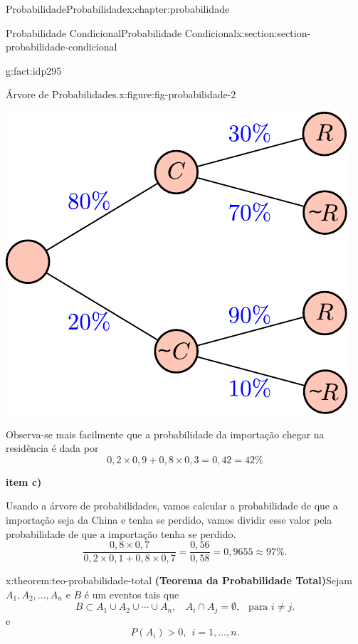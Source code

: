 \documentclass[oneside,10pt,]{book}
\newcommand{\terminology}[1]{\textbf{#1}}
\numberwithin{equation}{section}
\begin{document}
\begin{chapterptx}{Probabilidade}{}{Probabilidade}{}{}{x:chapter:probabilidade}
\begin{sectionptx}{Probabilidade Condicional}{}{Probabilidade Condicional}{}{}{x:section:section-probabilidade-condicional}
\begin{fact}{}{}{g:fact:idp295}
\begin{figureptx}{Árvore de Probabilidades.}{x:figure:fig-probabilidade-2}{}
\begin{image}{0.2}{0.6}{0.2}
\includegraphics[width=\linewidth]{images/pcondicionalb}
\end{image}%
\tcblower
\end{figureptx}%
Observa-se mais facilmente que a probabilidade da importação chegar na residência é dada por%
\begin{equation*}
0,2\times 0,9 + 0,8\times 0,3 = 0,42=42\% 
\end{equation*}
%
\par
\terminology{item c)}%
\par
Usando a árvore de probabilidades, vamos calcular a probabilidade de que a importação seja da China e tenha se perdido, vamos dividir esse valor pela probabilidade de que a importação tenha se perdido.%
\begin{equation*}
\frac{0,8\times 0,7}{0,2\times 0,1 + 0,8\times 0,7} = \frac{0,56}{0,58} = 0,9655 \approx 97\%.
\end{equation*}
%
\end{fact}
\begin{theorem}{}{}{x:theorem:teo-probabilidade-total}%
\terminology{(Teorema da Probabilidade Total)}Sejam \(A_1, A_2, \ldots, A_n\) e \(B\) é um eventos tais que%
\begin{equation*}
B\subset A_1\cup A_2\cup\cdots \cup A_n, ~~~~ A_i\cap A_j = \emptyset, ~~\text{ para } i\neq j. 
\end{equation*}
e%
\begin{equation*}
P(A_i)>0,~~ i = 1, \ldots, n.  

\end{equation*}
\end{theorem}
\end{sectionptx}
\end{chapterptx}
\end{document}
